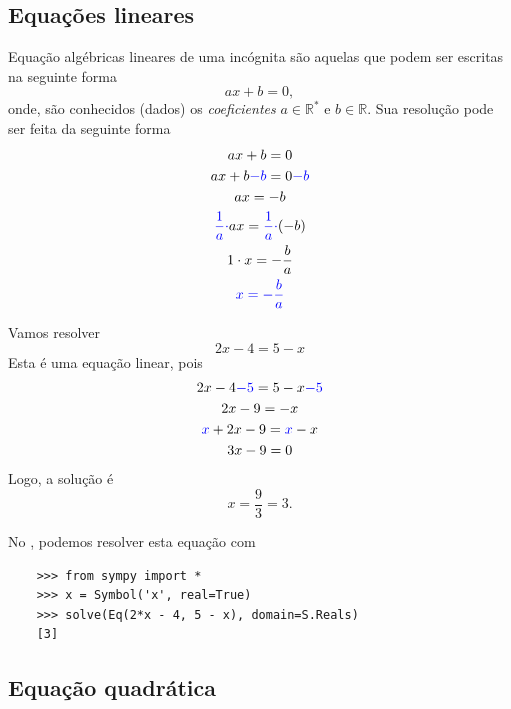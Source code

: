 \subsection{Equações lineares}

Equação algébricas lineares de uma incógnita são aquelas que podem ser escritas na seguinte forma
\begin{equation}
  ax + b = 0,
\end{equation}
onde, são conhecidos (dados) os \emph{coeficientes} $a\in\mathbb{R}^*$ e $b\in\mathbb{R}$. Sua resolução pode ser feita da seguinte forma
\begin{gather}
  ax + b = 0 \\
  ax + b {\color{blue}- b} = 0 {\color{blue}- b} \\
  ax = -b \\
  {\color{blue}\frac{1}{a}\cdot}ax = {\color{blue}\frac{1}{a}\cdot}(-b) \\
  1\cdot x = -\frac{b}{a} \\
  {\color{blue}x = -\frac{b}{a}}
\end{gather}

\begin{ex}
  Vamos resolver
  \begin{equation}
    2x -4 = 5 - x
  \end{equation}
  Esta é uma equação linear, pois
  \begin{gather}
    2x - 4 {\color{blue}- 5} = 5 - x {\color{blue}- 5} \\
    2x -9 = -x \\
    {\color{blue}x} + 2x - 9 = {\color{blue}x} - x \\
    3x - 9 = 0\\
  \end{gather}
  Logo, a solução é
  \begin{equation}
    x = \frac{9}{3} = 3.
  \end{equation}

  \ifispython
  No \python, podemos resolver esta equação com
  \begin{lstlisting}
    >>> from sympy import *
    >>> x = Symbol('x', real=True)
    >>> solve(Eq(2*x - 4, 5 - x), domain=S.Reals)
    [3]
  \end{lstlisting}
  \fi
\end{ex}

\subsection{Equação quadrática}


